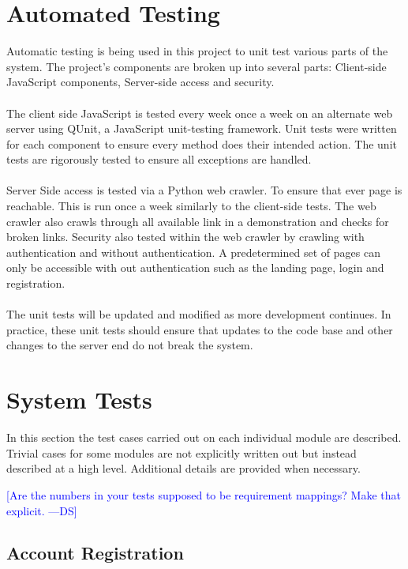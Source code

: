 \documentclass[12pt]{article}
\newcommand{\authornote}[3]{\textcolor{#1}{[#3 ---#2]}}
\newcommand{\authornote}[3]{}
\newcommand{\ds}[1]{\authornote{blue}{DS}{#1}}
\begin{document}
\section{Automated Testing}
Automatic testing is being used in this project to unit test various parts of the system. The project's components are broken up into several parts: Client-side JavaScript components, Server-side access and security.
\\ \\
The client side JavaScript is tested every week once a week on an alternate web server using QUnit, a JavaScript unit-testing framework. Unit tests were written for each component to ensure every method does their intended action. The unit tests are rigorously tested to ensure all exceptions are handled.
\\ \\
Server Side access is tested via a Python web crawler. To ensure that ever page is reachable. This is run once a week similarly to the client-side tests. The web crawler also crawls through all available link in a demonstration and checks for broken links. Security also tested within the web crawler by crawling with authentication and without authentication. A predetermined set of pages can only be accessible with out authentication such as the landing page, login and registration.
\\ \\
The unit tests will be updated and modified as more development continues. In practice, these unit tests should ensure that updates to the code base and other changes to the server end do not break the system.


\section{System Tests}
In this section the test cases carried out on each individual module are described. Trivial cases for some modules are not explicitly written out but instead described at a high level. Additional details are provided when necessary.

\ds{Are the numbers in your tests supposed to be requirement mappings? Make that explicit.}

\pagebreak

\subsection{Account Registration}
\end{document}
